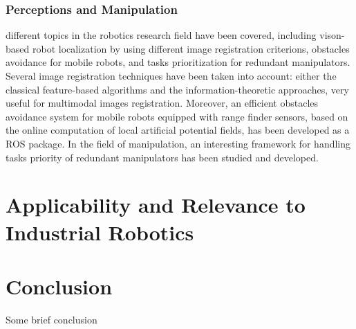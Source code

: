 \documentclass[conference]{IEEEtran}
\begin{document}
\subsubsection{Perceptions and Manipulation}
different topics in the robotics research field have been covered, including vison-based robot localization by using different image registration criterions, obstacles avoidance for mobile robots, and tasks prioritization for redundant manipulators.
Several image registration techniques have been taken into account: either the classical feature-based algorithms and the information-theoretic approaches, very useful for multimodal images registration.
Moreover, an efficient obstacles avoidance system for mobile robots equipped with range finder sensors, based on the online computation of local artificial potential fields, has been developed as a ROS package.
\newline In the field of manipulation, an interesting framework for handling tasks priority of redundant manipulators has been studied and developed.

\section{Applicability and Relevance to Industrial Robotics}


\section{Conclusion}
Some brief conclusion


 

\end{document}
